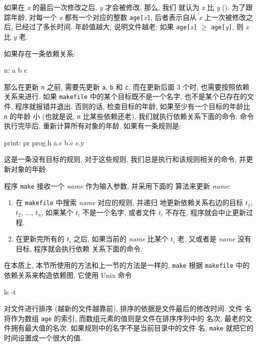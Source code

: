 如果在 \textit{x} 的最后一次修改之后, \textit{y} 才会被修改, 那么, 我们 
就认为 \textit{x} 比 \textit{y}  (). 为了跟踪年龄,
对每一个 \textit{x} 都有一个对应的整数 \texttt{age[}\textit{x}\texttt{]},
后者表示自从 \textit{x} 上一次被修改之后, 已经过了多长时间. 年龄值越大,
说明文件越老: 如果 \texttt{age[}\textit{x}\texttt{]} $\geqslant$ 
\texttt{age[}\textit{y}\texttt{]}, 则 \textit{x} 比 \textit{y} 老.

如果存在一条依赖关系:
\begin{shell}
    n: a b c
\end{shell}
那么在更新 \texttt{n} 之前, 需要先更新 \texttt{a}, \texttt{b} 和
\texttt{c},
而在更新后面 3 个时, 也需要按照依赖关系来进行. 如果 \texttt{makefile}
中的某个目标既不是一个名字, 也不是某个已存在的文件, 程序就报错并退出.
否则的话, 检查目标的年龄, 如果至少有一个目标的年龄比 \texttt{n} 的年龄
小 (也就是说, \texttt{n} 比某些依赖还老), 我们就执行依赖关系下面的命令.
命令执行完毕后, 重新计算所有对象的年龄. 如果有一条规则是:
\begin{shell}
    print:
                pr prog.h a.c b.c c.y
\end{shell}
这是一条没有目标的规则, 对于这些规则, 我们总是执行和该规则相关的命令,
并更新对象的年龄.

程序 \texttt{make} 接收一个 \textit{name} 作为输入参数, 并采用下面的
算法来更新 \textit{name}:
\begin{enumerate}
    \item 
        在 \texttt{makefile} 中搜索 \textit{name} 对应的规则, 并递归
        地更新依赖关系右边的目标 $t_1$, $t_2$, ..., $t_n$, 如果某个 
        $t_i$ 不是一个名字, 或者文件 $t_i$ 不存在, 程序就会中止更新过程.
    \item 
        在更新完所有的 $t_i$ 之后, 如果当前的 \textit{name} 比某个
        $t_i$ 老, 又或者是 \textit{name} 没有目标, 程序就会执行依赖
        关系下面的命令.
\end{enumerate}

在本质上, 本节所使用的方法和上一节的方法是一样的, \texttt{make} 根据
\texttt{makefile} 中的依赖关系来构造依赖图, 它使用 Unix 命令 
\begin{shell}
    ls -t
\end{shell}
对文件进行排序 (越新的文件越靠前), 排序的依据是文件最后的修改时间. 文件 
名将作为数组 \texttt{age} 的索引, 而数组元素的值则是文件在排序序列中的
名次, 最老的文件拥有最大值的名次. 如果规则中的名字不是当前目录中的文件
名, \texttt{make} 就把它的时间设置成一个很大的值.

